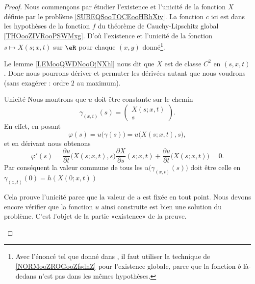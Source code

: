 \begin{proof}
    Nous commençons par étudier l'existence et l'unicité de la fonction \( X\) définie par le problème \ref{SUBEQSooTOCEooHRhXiv}. La fonction \( c\) ici est dans les hypothèses de la fonction $f$ du théorème de Cauchy-Lipschitz global \ref{THOooZIVRooPSWMxg}. D'où l'existence et l'unicité de la fonction \( s\mapsto X(s;x,t)\) sur \( \eR\) pour chaque \( (x,y)\) donné\footnote{Avec l'énoncé tel que donné dans \cite{ooAUICooVUjyqo}, il faut utiliser la technique de \ref{NORMooZROGooZfsdnZ} pour l'existence globale, parce que la fonction \( b\) là-dedans n'est pas dans les mêmes hypothèses.}.

    Le lemme \ref{LEMooQWDNooOjNXhl} nous dit que \( X\) est de classe \( C^2\) en \( (s,x,t)\). Donc nous pourrons dériver et permuter les dérivées autant que nous voudrons (sans exagérer : ordre \( 2\) au maximum).

    \begin{subproof}
        \item[Unicité]
            Nous montrons que \( u\) doit être constante sur le chemin
            \begin{equation}
                \gamma_{(x,t)}(s)=\begin{pmatrix}
                    X(s;x,t)    \\ 
                    s    
                \end{pmatrix}.
            \end{equation}
            En effet, en posant
            \begin{equation}
                \varphi(s)=u\big( \gamma(s) \big)=u\big( X(s;x,t),s \big),
            \end{equation}
            et en dérivant nous obtenons
            \begin{equation}
                \varphi'(s)=\frac{ \partial u }{ \partial t }\big( X(s;x,t),s \big)\frac{ \partial X }{ \partial s }(s;x,t)+\frac{ \partial u }{ \partial t }\big( X(s;x,t) \big)=0.
            \end{equation}
            Par conséquent la valeur commune de tous les \(   u\big( \gamma_{(x,t)}(s) \big)    \) doit être celle en \( \gamma_{(x,t)}(0)=h(  X(0;x,t)  ) \)

            Cela prouve l'unicité parce que la valeur de \( u\) est fixée en tout point. Nous devons encore vérifier que la fonction \( u\) ainsi construite est bien une solution du problème. C'est l'objet de la partie «existence» de la preuve.


\end{subproof}
\end{proof}
